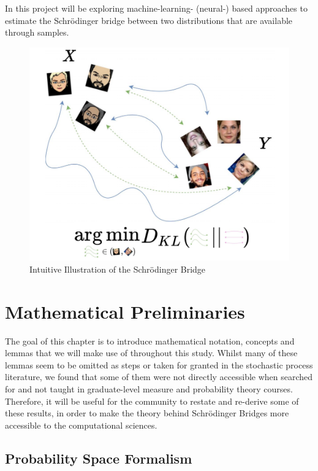 \documentclass[a4paper,12pt,twoside,openright]{report}
\theoremstyle{definition}
\begin{document}
 In this project will be exploring machine-learning- (neural-) based approaches to estimate the Schrödinger bridge between two distributions that are available through samples.
\begin{figure}
    \centering
    \includegraphics[scale=0.7]{images/charicaturistic_bridge.PNG}
    \caption{Intuitive Illustration of the Schrödinger Bridge}
    \label{fig:intuitive_bridge}
\end{figure}

 
\chapter{Mathematical Preliminaries}

\setcounter{page}{1}

The goal of this chapter is to introduce mathematical notation, concepts and lemmas that we will make use of throughout this study. Whilst many of these lemmas seem to be omitted as steps or taken for granted in the stochastic process literature, we found that some of them were not directly accessible when searched for and not taught in graduate-level measure and probability theory courses. Therefore, it will be useful for the community to restate and re-derive some of these results, in order to make the theory behind Schrödinger Bridges more accessible to the computational sciences.
\section{Probability Space Formalism}
\end{document}
